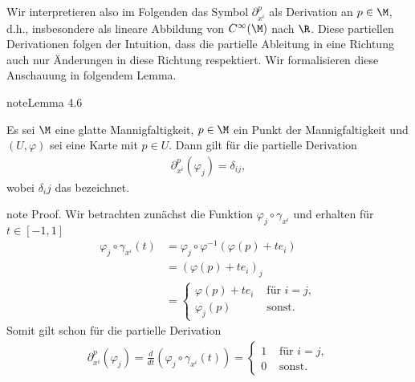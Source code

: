 \documentclass[letterpaper,10pt,english]{jupyterBook}
\begin{document}
\sphinxAtStartPar
Wir interpretieren also im Folgenden das Symbol \(\partial_{x^{i}}^p\) als Derivation an \(p\in\M\), d.h., insbesondere als lineare Abbildung von \(C^\infty(\M)\) nach \(\R\).
Diese partiellen Derivationen folgen der Intuition, dass die partielle Ableitung in eine Richtung auch nur Änderungen in diese Richtung respektiert.
Wir formalisieren diese Anschauung in folgendem Lemma.
\label{manifolds/tangential:lem:partderkron}
\begin{sphinxadmonition}{note}{Lemma 4.6}



\sphinxAtStartPar
Es sei \(\M\) eine glatte Mannigfaltigkeit, \(p\in\M\) ein Punkt der Mannigfaltigkeit und \((U,\varphi)\) sei eine Karte mit \(p\in U\).
Dann gilt für die partielle Derivation
\begin{equation*}
\begin{split}\partial_{x^i}^p(\varphi_j) = \delta_{ij},\end{split}
\end{equation*}
\sphinxAtStartPar
wobei \(\delta_ij\) das  bezeichnet.
\end{sphinxadmonition}

\begin{sphinxadmonition}{note}
\sphinxAtStartPar
Proof. Wir betrachten zunächst die Funktion \(\varphi_j \circ \gamma_{x^i}\) und erhalten für \(t\in [-1,1]\)
\begin{equation*}
\begin{split}\varphi_j \circ \gamma_{x^i}(t)
&= \varphi_j \circ \varphi^{-1}(\varphi(p) + t e_i)\\
&= (\varphi(p) + t e_i)_j\\ 
&=
\begin{cases}
\varphi(p) + t e_i &\text{ für } i=j,\\
\varphi_j(p)&\text{ sonst}.
\end{cases}\end{split}
\end{equation*}
\sphinxAtStartPar
Somit gilt schon für die partielle Derivation
\begin{equation*}
\begin{split}\partial_{x^i}^p(\varphi_j)=
\frac{d}{dt} (\varphi_j \circ \gamma_{x^i}(t)) = 
\begin{cases}
1&\text{ für } i=j,\\
0&\text{ sonst}.
\end{cases}\end{split}
\end{equation*}\end{sphinxadmonition}
\end{document}
